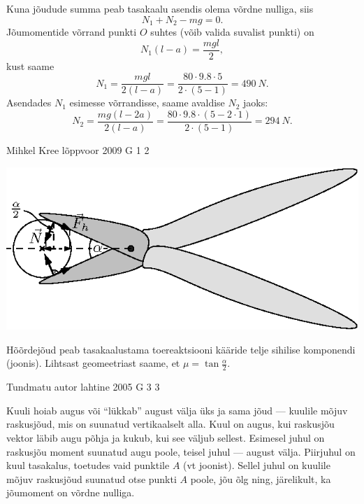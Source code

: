 \documentclass[11pt]{article}
\begin{document}
{{Kuna jõudude summa peab tasakaalu asendis olema võrdne nulliga, siis
\[
N_1 + N_2 - mg = 0.
\]
Jõumomentide võrrand punkti $O$ suhtes (võib valida suvalist punkti) on
\[
N_{1}(l-a)=\frac{m g l}{2},
\]
kust saame
\[
N_{1}=\frac{m g l}{2(l-a)}=\frac{80 \cdot \num{9,8} \cdot 5}{2 \cdot(5-1)}=\SI{490}{N}.
\]
Asendades $N_1$ esimesse võrrandisse, saame avaldise $N_2$ jaoks:
\[
N_{2}=\frac{m g(l-2 a)}{2(l-a)}=\frac{80 \cdot \num{9,8} \cdot(5-2 \cdot 1)}{2 \cdot(5-1)}=\SI{294}{N}.
\]
\fi
}

{Mihkel Kree} %
{lõppvoor} %
{2009} %
{G 1} %
{2} %
{

\ifSolution
\begin{center}
	\includegraphics[width=0.9\linewidth]{2009-v3g-01-G_nyrinenud_kaarid_lah.eps}
\end{center}

Hõõrdejõud peab tasakaalustama toereaktsiooni kääride telje sihilise komponendi (joonis). Lihtsast geomeetriast saame, et $\mu = \tan \frac{\alpha}{2}$.
\fi
}

{Tundmatu autor} %
{lahtine} %
{2005} %
{G 3} %
{3} %
{

\ifSolution
Kuuli hoiab augus või \enquote{lükkab} august välja üks ja sama jõud --- kuulile mõjuv raskusjõud, mis on suunatud vertikaalselt alla. Kuul on augus, kui raskusjõu vektor läbib augu põhja ja kukub, kui see väljub sellest. Esimesel juhul on raskusjõu moment suunatud augu poole, teisel juhul --- august välja. Piirjuhul on kuul tasakalus, toetudes vaid punktile $A$ (vt joonist). Sellel juhul on kuulile mõjuv raskusjõud suunatud otse punkti $A$ poole, jõu õlg ning, järelikult, ka jõumoment on võrdne nulliga.

}}
\end{document}
